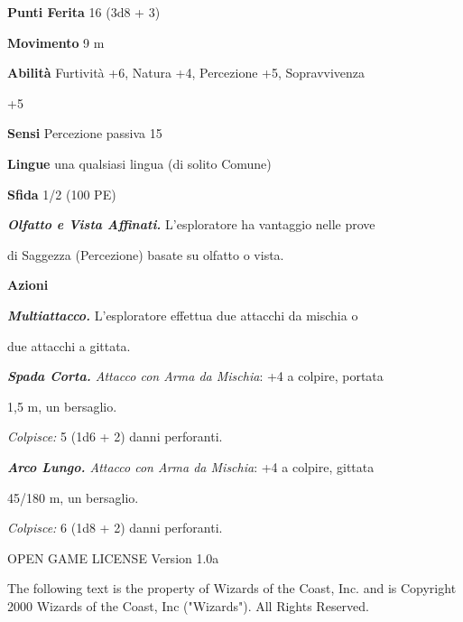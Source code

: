 \begin{multicols}{2}
\textbf{Punti Ferita} 16 (3d8 + 3)

\textbf{Movimento} 9 m

\textbf{Abilità} Furtività +6, Natura +4, Percezione +5, Sopravvivenza

+5

\textbf{Sensi} Percezione passiva 15

\textbf{Lingue} una qualsiasi lingua (di solito Comune)

\textbf{Sfida} 1/2 (100 PE)

\emph{\textbf{Olfatto e Vista Affinati.}} L'esploratore ha vantaggio
nelle prove

di Saggezza (Percezione) basate su olfatto o vista.

\textbf{Azioni}

\emph{\textbf{Multiattacco.}} L'esploratore effettua due attacchi da
mischia o

due attacchi a gittata.

\emph{\textbf{Spada Corta.} Attacco con Arma da Mischia}: +4 a colpire,
portata

1,5 m, un bersaglio.

\emph{Colpisce:} 5 (1d6 + 2) danni perforanti.

\emph{\textbf{Arco Lungo.} Attacco con Arma da Mischia}: +4 a colpire,
gittata

45/180 m, un bersaglio.

\emph{Colpisce:} 6 (1d8 + 2) danni perforanti.




OPEN GAME LICENSE Version 1.0a

The following text is the property of Wizards of the Coast, Inc. and is
Copyright 2000 Wizards of the Coast, Inc ("Wizards"). All Rights
Reserved.



\end{multicols}
